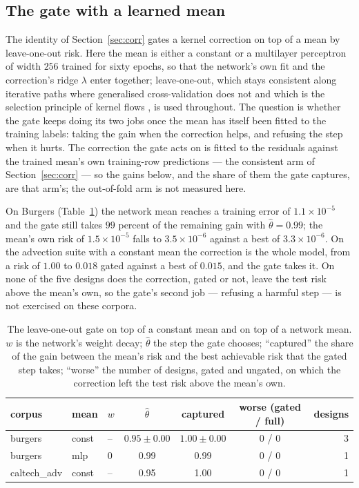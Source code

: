 \documentclass[11pt]{article}
\theoremstyle{definition}
\newcommand{\numAdvRiskBest}{0.015}
\newcommand{\numAdvRiskGated}{0.018}
\newcommand{\numAdvRiskMean}{1.00}
\newcommand{\numGateCaptured}{99}
\newcommand{\numGateRiskBest}{3.3\times10^{-6}}
\newcommand{\numGateRiskGated}{3.5\times10^{-6}}
\newcommand{\numGateRiskMean}{1.5\times10^{-5}}
\newcommand{\numGateTheta}{0.99}
\newcommand{\numGateTrainMse}{1.1\times10^{-5}}
\begin{document}
\subsection{The gate with a learned mean}

The identity of Section~\ref{sec:corr} gates a kernel correction on top of a mean by leave-one-out
risk. Here the mean is either a constant or a multilayer perceptron of width $256$ trained for sixty
epochs, so that the network's own fit and the correction's ridge $\lambda$ enter together;
leave-one-out, which stays consistent along iterative paths where generalised cross-validation
\cite{GHW} does not \cite{Patil} and which is the selection principle of kernel flows
\cite{OwhadiYoo,HamziOwhadi}, is used throughout. The question is whether the gate keeps doing its
two jobs once the mean has itself been fitted to the training labels: taking the gain when the
correction helps, and refusing the step when it hurts. The correction the gate acts on is fitted to
the residuals against the trained mean's own training-row predictions --- the consistent arm of
Section~\ref{sec:corr} --- so the gains below, and the share of them the gate captures, are that
arm's; the out-of-fold arm is not measured here.

On Burgers (Table~\ref{tab:gatemlp}) the network mean reaches a training error of
$\numGateTrainMse$ and the gate still takes $\numGateCaptured$ percent of the remaining gain with
$\hat\theta=\numGateTheta$; the mean's own risk of $\numGateRiskMean$ falls to $\numGateRiskGated$
against a best of $\numGateRiskBest$. On the advection suite with a constant mean the correction is
the whole model, from a risk of $\numAdvRiskMean$ to $\numAdvRiskGated$ gated against a best of
$\numAdvRiskBest$, and the gate takes it. On none of the five designs does the correction, gated or
not, leave the test risk above the mean's own, so the gate's second job --- refusing a harmful step
--- is not exercised on these corpora.

\begin{table}[t]
\centering\small
\caption{The leave-one-out gate on top of a constant mean and on top of a network mean. $w$ is the
network's weight decay; $\hat\theta$ the step the gate chooses; ``captured'' the share of the gain
between the mean's risk and the best achievable risk that the gated step takes; ``worse'' the
number of designs, gated and ungated, on which the correction left the test risk above the mean's
own.}
\label{tab:gatemlp}
\begin{tabular}{@{}lllcccr@{}}
\toprule
corpus & mean & $w$ & $\hat\theta$ & captured & worse (gated / full) & designs\\
\midrule
burgers  & const & -- & $0.95\pm0.00$ & $1.00\pm0.00$ & 0 / 0 & 3\\
burgers  & mlp & 0 & 0.99 & 0.99 & 0 / 0 & 1\\
caltech\_adv  & const & -- & 0.95 & 1.00 & 0 / 0 & 1\\
\bottomrule
\end{tabular}
\end{table}
\end{document}
